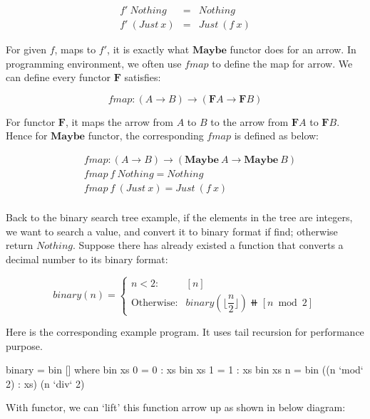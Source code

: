 \documentclass[b5paper]{article}
\begin{document}
\begin{example}
\[
\begin{array}{lcl}
f'\ Nothing & = & Nothing \\
f'\ (Just\ x) & = & Just\ (f\ x)
\end{array}
\]

For given $f$, maps to $f'$, it is exactly what $\mathbf{Maybe}$ functor does for an arrow. In programming environment, we often use $fmap$ to define the map for arrow. We can define every functor $\mathbf{F}$ satisfies:

\[
fmap : (A \to B) \to (\mathbf{F} A \to \mathbf{F} B)
\]

For functor $\mathbf{F}$, it maps the arrow from $A$ to $B$ to the arrow from $\mathbf{F} A$ to $\mathbf{F} B$. Hence for $\mathbf{Maybe}$ functor, the corresponding $fmap$ is defined as below:

\[
\begin{array}{l}
\quad    fmap : (A \to B) \to (\mathbf{Maybe}\ A \to \mathbf{Maybe}\ B) \\
\quad    fmap\ f\ Nothing = Nothing \\
\quad    fmap\ f\ (Just\ x) = Just\ (f\ x) \\
\end{array}
\]

Back to the binary search tree example, if the elements in the tree are integers, we want to search a value, and convert it to binary format if find; otherwise return $Nothing$. Suppose there has already existed a function that converts a decimal number to its binary format:

\[
binary(n) = \begin{cases}
n < 2: & [n] \\
\text{Otherwise}: & binary(\lfloor\dfrac{n}{2}\rfloor)\doubleplus[n \bmod 2]
\end{cases}
\]

Here is the corresponding example program. It uses tail recursion for performance purpose.

\lstset{frame=single}
\begin{Haskell}
binary = bin [] where
   bin xs 0 = 0 : xs
   bin xs 1 = 1 : xs
   bin xs n = bin ((n `mod` 2) : xs) (n `div` 2)
\end{Haskell}

With functor, we can `lift' this function arrow up as shown in below diagram:

\begin{center}
\end{center}


\end{example}
\end{document}

